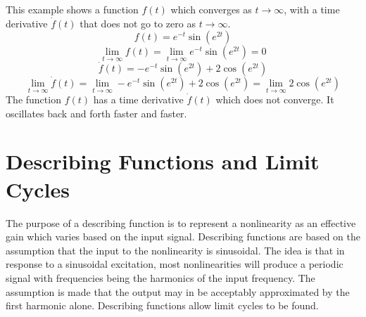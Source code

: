 This example shows a function $f(t)$ which converges as $t\rightarrow\infty$, with a time derivative $\dot{f}(t)$ that does not go to zero as $t\rightarrow\infty$.
\begin{equation*}
  f(t)=e^{-t}\sin(e^{2t})
\end{equation*}
\begin{equation*}
  \lim_{t\rightarrow\infty}f(t)=\lim_{t\rightarrow\infty}e^{-t}\sin(e^{2t})=0
\end{equation*}
\begin{equation*}
  \dot{f}(t)=-e^{-t}\sin(e^{2t})+2\cos(e^{2t})
\end{equation*}
\begin{equation*}
  \lim_{t\rightarrow\infty}\dot{f}(t)=\lim_{t\rightarrow\infty}-e^{-t}\sin(e^{2t})+2\cos(e^{2t})=\lim_{t\rightarrow\infty}2\cos(e^{2t})
\end{equation*}
The function $f(t)$ has a time derivative $\dot{f}(t)$ which does not converge.
It oscillates back and forth faster and faster.

\section{Describing Functions and Limit Cycles}
The purpose of a describing function is to represent a nonlinearity as an effective gain which varies based on the input signal.
Describing functions are based on the assumption that the input to the nonlinearity is sinusoidal.
The idea is that in response to a sinusoidal excitation, most nonlinearities will produce a periodic signal with frequencies being the harmonics of the input frequency.
The assumption is made that the output may in be acceptably approximated by the first harmonic alone.
Describing functions allow limit cycles to be found.

